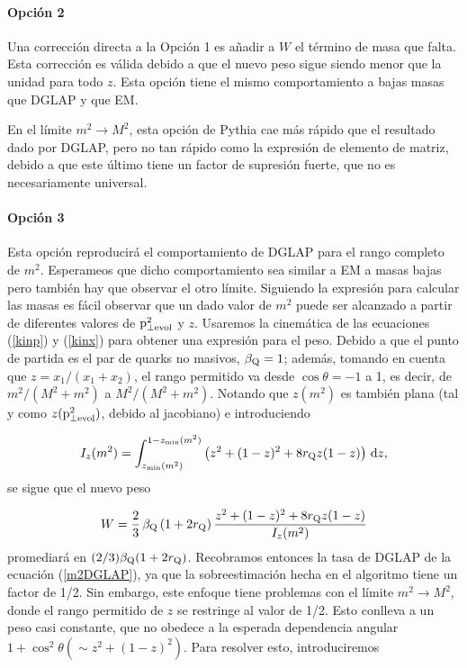 \documentclass[a4paper,12pt]{article}
\begin{document}
\paragraph{Opción 2}

Una corrección directa a la Opción 1 es añadir a $W$ el término de masa que falta. Esta corrección es válida debido a que el nuevo peso sigue siendo menor que la unidad para todo $z$. Esta opción tiene el mismo comportamiento a bajas masas que DGLAP y que EM.

En el límite $m^2\to M^2$, esta opción de Pythia cae más rápido que el resultado dado por DGLAP, pero no tan rápido como la expresión de elemento de matriz, debido a que este último tiene un factor de supresión fuerte, que no es necesariamente universal.

\paragraph{Opción 3}

Esta opción reproducirá el comportamiento de DGLAP para el rango completo de $m^2$. Esperameos que dicho comportamiento sea similar a EM a masas bajas pero también hay que observar el otro límite. Siguiendo la expresión para calcular las masas es fácil observar que un dado valor de $m^2$ puede ser alcanzado a partir de diferentes valores de ${\mathrm p}^2_{\perp\mathrm{evol}}$ y $z$. Usaremos la cinemática de las ecuaciones (\ref{kinp}) y (\ref{kinx}) para obtener una expresión para el peso. Debido a que el punto de partida es el par de quarks no masivos, $\beta_{\mathrm Q}=1$; además, tomando en cuenta que $z=x_1/(x_1+x_2)$, el rango permitido va desde $\cos\theta=-1$ a 1, es decir, de $m^2/(M^2+m^2)$ a $M^2/(M^2+m^2)$. Notando que $z(m^2)$ es también plana (tal y como $z({\mathrm p}^2_{\perp\mathrm{evol}})$, debido al jacobiano) e introduciendo

\begin{equation}
I_z(m^2) = \int_{z_{\mathrm{min}}(m^2)}^{1 - z_{\mathrm{min}}(m^2)} 
\left( z^2 + (1 - z)^2 + 8 r_{{\mathrm Q}} z (1 - z) \right) \, {\mathrm d} z,
\label{intz}
\end{equation}
se sigue que el nuevo peso

\begin{equation}
W = \frac{2}{3} \, \beta_{{\mathrm Q}} \, (1 + 2 r_{{\mathrm Q}}) \,
\frac{ z^2 + (1 - z)^2 + 8 r_{{\mathrm Q}} z (1 - z) }{I_z(m^2)}
\label{wtone}
\end{equation}
promediará en $(2/3)\beta_{\mathrm Q}(1+2r_{\mathrm Q})$. Recobramos entonces la tasa de DGLAP de la ecuación (\ref{m2DGLAP}), ya que la sobreestimación hecha en el algoritmo tiene un factor de 1/2. Sin embargo, este enfoque tiene problemas con el límite $m^2\to M^2$, donde el rango permitido de $z$ se restringe al valor de 1/2. Esto conlleva a un peso casi constante, que no obedece a la esperada dependencia angular $1+\cos^2\theta (\sim z^2+(1-z)^2)$. Para resolver esto, introduciremos
\end{document}
